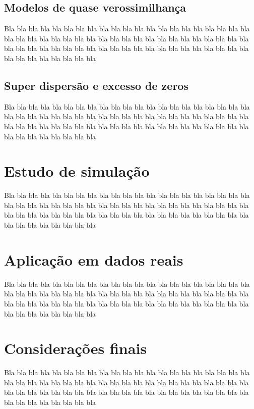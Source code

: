 \documentclass[
	article,			%
	12pt,				%
	oneside,			%
	a4paper,			%
	english,			%
	brazil,				%
	sumario=tradicional
	]{abntex2}
\begin{document}
\subsection{Modelos de quase verossimilhança}
Bla bla bla bla bla bla bla bla bla bla bla bla bla bla bla bla bla bla bla bla bla bla bla bla bla bla bla bla bla bla bla bla bla bla bla bla bla bla bla bla bla bla bla bla bla bla bla bla bla bla bla bla bla bla bla bla bla bla bla bla bla bla bla bla bla bla bla bla bla bla bla

\subsection{Super dispersão e excesso de zeros}
Bla bla bla bla bla bla bla bla bla bla bla bla bla bla bla bla bla bla bla bla bla bla bla bla bla bla bla bla bla bla bla bla bla bla bla bla bla bla bla bla bla bla bla bla bla bla bla bla bla bla bla bla bla bla bla bla bla bla bla bla bla bla bla bla bla bla bla bla bla bla bla

\section{Estudo de simulação}
Bla bla bla bla bla bla bla bla bla bla bla bla bla bla bla bla bla bla bla bla bla bla bla bla bla bla bla bla bla bla bla bla bla bla bla bla bla bla bla bla bla bla bla bla bla bla bla bla bla bla bla bla bla bla bla bla bla bla bla bla bla bla bla bla bla bla bla bla bla bla bla

\section{Aplicação em dados reais}
Bla bla bla bla bla bla bla bla bla bla bla bla bla bla bla bla bla bla bla bla bla bla bla bla bla bla bla bla bla bla bla bla bla bla bla bla bla bla bla bla bla bla bla bla bla bla bla bla bla bla bla bla bla bla bla bla bla bla bla bla bla bla bla bla bla bla bla bla bla bla bla

\section{Considerações finais}
Bla bla bla bla bla bla bla bla bla bla bla bla bla bla bla bla bla bla bla bla bla bla bla bla bla bla bla bla bla bla bla bla bla bla bla bla bla bla bla bla bla bla bla bla bla bla bla bla bla bla bla bla bla bla bla bla bla bla bla bla bla bla bla bla bla bla bla bla bla bla bla
\end{document}
